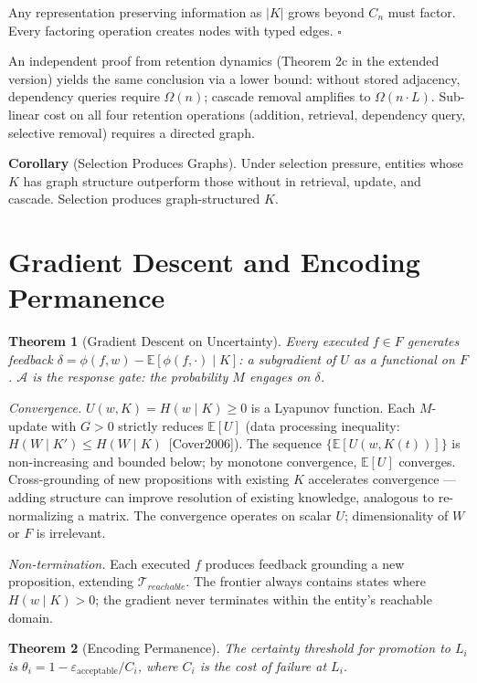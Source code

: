 \documentclass[11pt]{article}
\newtheorem{theorem}{Theorem}
\begin{document}
Any representation preserving information as $|K|$ grows beyond $C_n$ must factor. Every factoring operation creates nodes with typed edges. $\square$

An independent proof from retention dynamics (Theorem 2c in the extended version) yields the same conclusion via a lower bound: without stored adjacency, dependency queries require $\Omega(n)$; cascade removal amplifies to $\Omega(n \cdot L)$. Sub-linear cost on all four retention operations (addition, retrieval, dependency query, selective removal) requires a directed graph.

\textbf{Corollary} (Selection Produces Graphs). Under selection pressure, entities whose $K$ has graph structure outperform those without in retrieval, update, and cascade. Selection produces graph-structured $K$.

\section{Gradient Descent and Encoding Permanence}

\begin{theorem}[Gradient Descent on Uncertainty]\label{thm:gradient}
Every executed $f \in F$ generates feedback $\delta = \phi(f,w) - \mathbb{E}[\phi(f,\cdot) \mid K]$: a subgradient of $U$ as a functional on $F$. $\mathcal{A}$ is the response gate: the probability $M$ engages on $\delta$.
\end{theorem}

\emph{Convergence.} $U(w,K) = H(w \mid K) \geq 0$ is a Lyapunov function. Each $M$-update with $G > 0$ strictly reduces $\mathbb{E}[U]$ (data processing inequality: $H(W \mid K') \leq H(W \mid K)$~[Cover2006]). The sequence $\{\mathbb{E}[U(w, K(t))]\}$ is non-increasing and bounded below; by monotone convergence, $\mathbb{E}[U]$ converges. Cross-grounding of new propositions with existing $K$ accelerates convergence --- adding structure can improve resolution of existing knowledge, analogous to re-normalizing a matrix. The convergence operates on scalar $U$; dimensionality of $W$ or $F$ is irrelevant.

\emph{Non-termination.} Each executed $f$ produces feedback grounding a new proposition, extending $\mathcal{T}_{reachable}$. The frontier always contains states where $H(w \mid K) > 0$; the gradient never terminates within the entity's reachable domain.

\begin{theorem}[Encoding Permanence]\label{thm:encoding}
The certainty threshold for promotion to $L_i$ is $\theta_i = 1 - \varepsilon_\text{acceptable}/C_i$, where $C_i$ is the cost of failure at $L_i$.
\end{theorem}
\end{document}
